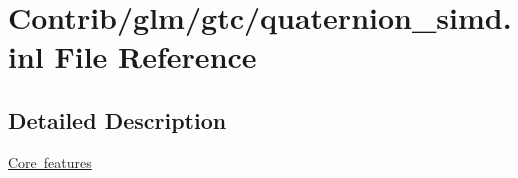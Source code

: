 \hypertarget{quaternion__simd_8inl}{}\section{Contrib/glm/gtc/quaternion\+\_\+simd.inl File Reference}
\label{quaternion__simd_8inl}


\subsection{Detailed Description}
\mbox{\hyperlink{group__core}{Core features}} 